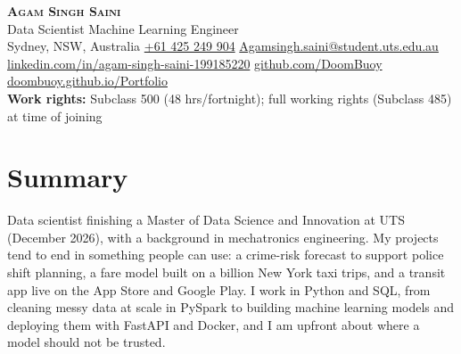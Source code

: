 \documentclass[letterpaper,11pt]{article}
\newcommand{\targetrole}{Data Scientist \textbar{} Machine Learning Engineer}
\newcommand{\plainlink}[1]{\href{https://#1}{#1}}
\begin{document}
\begin{center}
  {\Huge \scshape \textbf{Agam Singh Saini}} \\ \vspace{3pt}
  {\large \targetrole} \\ \vspace{3pt}
  \small
  Sydney, NSW, Australia \textbar{}
  \href{tel:+61425249904}{+61 425 249 904} \textbar{}
  \href{mailto:Agamsingh.saini@student.uts.edu.au}{Agamsingh.saini@student.uts.edu.au} \\ \vspace{1pt}
  \plainlink{linkedin.com/in/agam-singh-saini-199185220} \textbar{}
  \plainlink{github.com/DoomBuoy} \textbar{}
  \plainlink{doombuoy.github.io/Portfolio} \\ \vspace{3pt}
  \textbf{Work rights:} Subclass 500 (48 hrs/fortnight); full working rights (Subclass 485) at time of joining
\end{center}

\section{Summary}
\small{
Data scientist finishing a Master of Data Science and Innovation at UTS (December 2026), with a background in mechatronics engineering. My projects tend to end in something people can use: a crime-risk forecast to support police shift planning, a fare model built on a billion New York taxi trips, and a transit app live on the App Store and Google Play. I work in Python and SQL, from cleaning messy data at scale in PySpark to building machine learning models and deploying them with FastAPI and Docker, and I am upfront about where a model should not be trusted.
}

\end{document}
